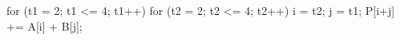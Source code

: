 for (t1 = 2; t1 <= 4; t1++) {
  for (t2 = 2; t2 <= 4; t2++) {
    i = t2; j = t1;
    P[i+j] += A[i] + B[j];
  }
}
